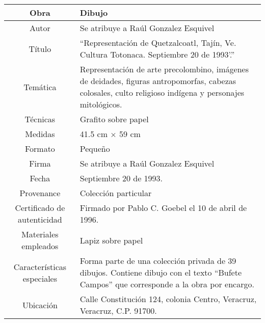 \begin{table}[H]
\centering
\begin{tabular}{|c|m{}|}
\hline
Obra& Dibujo	\\
\hline
Autor & Se atribuye a Ra\'ul Gonzalez Esquivel\\
\hline
T\'itulo & ``Representaci\'on de Quetzalcoatl, Taj\'in, Ve. Cultura Totonaca. Septiembre 20 de 1993'.'' \\
\hline
Tem\'atica & Representaci\'on de arte precolombino, im\'agenes de deidades, figuras antropomorfas, cabezas colosales, culto religioso ind\'igena y personajes mitol\'ogicos.\\
\hline
T\'ecnicas &Grafito sobre papel \\
\hline
Medidas & 41.5 cm $\times$ 59 cm \\
\hline
 Formato & Peque\~no \\
 \hline
 Firma & Se atribuye a Ra\'ul Gonzalez Esquivel  \\
 \hline
 Fecha & Septiembre 20 de 1993. \\
 \hline
 Provenance & Colecci\'on particular\\
 \hline
 Certificado de autenticidad& Firmado por Pablo C. Goebel el 10 de abril de 1996.  \\
 \hline 
  Materiales empleados & Lapiz sobre papel\\
 \hline
 Caracter\'isticas especiales & Forma parte de una colecci\'on privada de 39 dibujos. 
Contiene dibujo con el texto ``Bufete Campos'' que corresponde a la obra por encargo. \\
\hline 
Ubicaci\'on & Calle Constituci\'on 124, colonia Centro, Veracruz, Veracruz, C.P. 91700.\\
\hline

\end{tabular}
\end{table}

